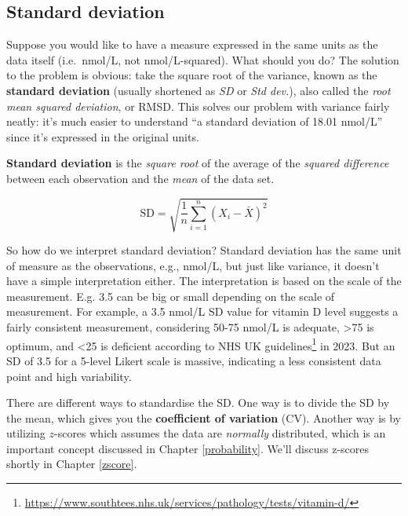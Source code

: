 \documentclass[
  11pt,
  a4paper,
  twoside,symmetric,openright]{book}
\theoremstyle{break}
\theoremstyle{break}
\begin{document}
\hypertarget{sd}{%
\subsection{Standard deviation}\label{sd}}

Suppose you would like to have a measure expressed in the same units as the data itself (i.e.~nmol/L, not nmol/L-squared). What should you do? The solution to the problem is obvious: take the square root of the variance, known as the \textbf{standard deviation} (usually shortened as \emph{SD} or \emph{Std dev.}), also called the \emph{root mean squared deviation}, or RMSD. This solves our problem with variance fairly neatly: it's much easier to understand ``a standard deviation of 18.01 nmol/L'' since it's expressed in the original units.

\begin{definition}
\protect\hypertarget{def:defSD}{}\label{def:defSD}\textbf{Standard deviation} is the \emph{square root} of the average of the \emph{squared difference} between each observation and the \emph{mean} of the data set.

\[
\mbox{SD} = \sqrt{ \frac{1}{n} \sum_{i=1}^n \left( X_i - \bar{X} \right)^2 }
\]
\end{definition}

So how do we interpret standard deviation? Standard deviation has the same unit of measure as the observations, e.g., nmol/L, but just like variance, it doesn't have a simple interpretation either. The interpretation is based on the scale of the measurement. E.g. 3.5 can be big or small depending on the scale of measurement. For example, a 3.5 nmol/L SD value for vitamin D level suggests a fairly consistent measurement, considering 50-75 nmol/L is adequate, \textgreater75 is optimum, and \textless25 is deficient according to NHS UK guidelines\footnote{\url{https://www.southtees.nhs.uk/services/pathology/tests/vitamin-d/}} in 2023. But an SD of 3.5 for a 5-level Likert scale is massive, indicating a less consistent data point and high variability.

There are different ways to standardise the SD. One way is to divide the SD by the mean, which gives you the \textbf{coefficient of variation} (CV). Another way is by utilizing \(z\)-scores which assumes the data are \emph{normally} distributed, which is an important concept discussed in Chapter \ref{probability}. We'll discuss z-scores shortly in Chapter \ref{zscore}.
\end{document}
